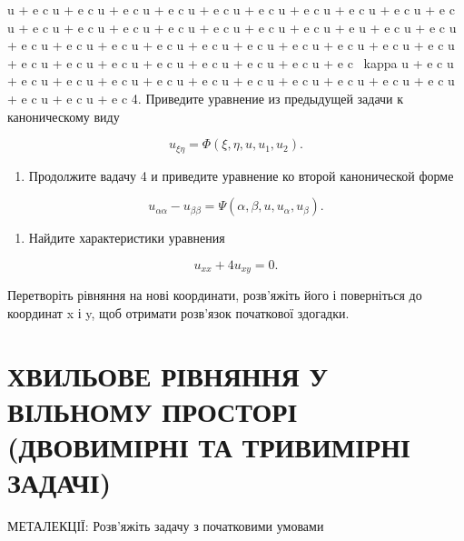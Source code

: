 \documentclass[
  ukrainian,
]{article}
\providecommand{\tightlist}{%
  \setlength{\itemsep}{0pt}\setlength{\parskip}{0pt}}
\begin{document}
\kappa u + e c \kappa u + e c \kappa u + e c \kappa u + e c \kappa u + e
c \kappa u + e c \kappa u + e c \kappa u + e c \kappa u + e c \kappa u +
e c \kappa u + e c \kappa u + e c \kappa u + e c \kappa u + e c \kappa u
+ e c \kappa u + e c \kappa u + e c \kappa u + e u + e c \kappa u + e c
\kappa u + e c \kappa u + e c \kappa u + e c \kappa u + e c \kappa u + e
c \kappa u + e c \kappa u + e c \kappa u + e c \kappa u + e c \kappa u +
e c \kappa u + e c \kappa u + e c \kappa u + e c \kappa u + e c \kappa u
+ e c \kappa u + e c \kappa u + e c \kappa u + e c ~kappa u + e c
\kappa u + e c \kappa u + e c \kappa u + e c \kappa u + e c \kappa u + e
c \kappa u + e c \kappa u + e c \kappa u + e c \kappa u + e c \kappa u +
e c \kappa u + e c \kappa u + e c \kappa u + e c 4. Приведите уравнение
из предыдущей задачи к каноническому виду

\[
u_{\xi\eta} = \Phi(\xi, \eta, u, u_1, u_2).
\]

\begin{enumerate}
\def\labelenumi{\arabic{enumi}.}
\setcounter{enumi}{4}
\tightlist
\item
  Продолжите вадачу 4 и приведите уравнение ко второй канонической форме
\end{enumerate}

\[
u_{\alpha\alpha} - u_{\beta\beta} = \Psi(\alpha, \beta, u, u_{\alpha}, u_{\beta}).
\]

\begin{enumerate}
\def\labelenumi{\arabic{enumi}.}
\setcounter{enumi}{5}
\tightlist
\item
  Найдите характеристики уравнения
\end{enumerate}

\[
u_{xx} + 4u_{xy} = 0.
\]

Перетворіть рівняння на нові координати, розв'яжіть його і поверніться
до координат x і y, щоб отримати розв'язок початкової здогадки.

\section{ХВИЛЬОВЕ РІВНЯННЯ У ВІЛЬНОМУ ПРОСТОРІ (ДВОВИМІРНІ ТА ТРИВИМІРНІ
ЗАДАЧІ)}\label{ux445ux432ux438ux43bux44cux43eux432ux435-ux440ux456ux432ux43dux44fux43dux43dux44f-ux443-ux432ux456ux43bux44cux43dux43eux43cux443-ux43fux440ux43eux441ux442ux43eux440ux456-ux434ux432ux43eux432ux438ux43cux456ux440ux43dux456-ux442ux430-ux442ux440ux438ux432ux438ux43cux456ux440ux43dux456-ux437ux430ux434ux430ux447ux456}

МЕТАЛЕКЦІЇ: Розв'яжіть задачу з початковими умовами
\end{document}
